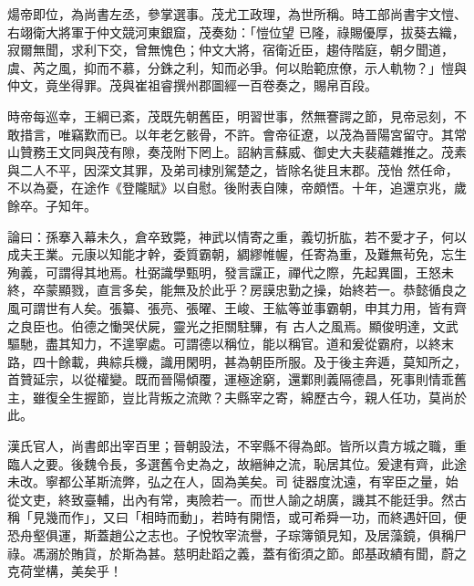 \begin{pinyinscope}
 煬帝即位，為尚書左丞，參掌選事。茂尤工政理，為世所稱。時工部尚書宇文愷、右翊衛大將軍于仲文競河東銀窟，茂奏劾：「愷位望
 已隆，祿賜優厚，拔葵去織，寂爾無聞，求利下交，曾無愧色；仲文大將，宿衛近臣，趨侍階庭，朝夕聞道，虞、芮之風，抑而不慕，分銖之利，知而必爭。何以貽範庶僚，示人軌物？」愷與仲文，竟坐得罪。茂與崔祖睿撰州郡圖經一百卷奏之，賜帛百段。



 時帝每巡幸，王綱已紊，茂既先朝舊臣，明習世事，然無謇諤之節，見帝忌刻，不敢措言，唯竊歎而已。以年老乞骸骨，不許。會帝征遼，以茂為晉陽宮留守。其常山贊務王文同與茂有隙，奏茂附下罔上。詔納言蘇威、御史大夫裴蘊雜推之。茂素與二人不平，因深文其罪，及弟司棣別駕楚之，皆除名徙且末郡。茂怡
 然任命，不以為憂，在途作《登隴賦》以自慰。後附表自陳，帝頗悟。十年，追還京兆，歲餘卒。子知年。



 論曰：孫搴入幕未久，倉卒致斃，神武以情寄之重，義切折肱，若不愛才子，何以成夫王業。元康以知能才幹，委質霸朝，綢繆帷幄，任寄為重，及難無茍免，忘生殉義，可謂得其地焉。杜弼識學甄明，發言讜正，禪代之際，先起異圖，王怒未終，卒蒙顯戮，直言多矣，能無及於此乎？房謨忠勤之操，始終若一。恭懿循良之風可謂世有人矣。張纂、張亮、張曜、王峻、王紘等並事霸朝，申其力用，皆有齊之良臣也。伯德之慟哭伏屍，靈光之拒關駐驆，有
 古人之風焉。顯俊明達，文武驅馳，盡其知力，不遑寧處。可謂德以稱位，能以稱官。道和爰從霸府，以終末路，四十餘載，典綜兵機，識用閑明，甚為朝臣所服。及于後主奔遁，莫知所之，首贊延宗，以從權變。既而晉陽傾覆，運極途窮，還鄴則義隔德昌，死事則情乖舊主，雖復全生握節，豈比背叛之流歟？夫縣宰之寄，綿歷古今，親人任功，莫尚於此。



 漢氏官人，尚書郎出宰百里；晉朝設法，不宰縣不得為郎。皆所以貴方城之職，重臨人之要。後魏令長，多選舊令史為之，故縉紳之流，恥居其位。爰逮有齊，此途未改。寧都公革斯流弊，弘之在人，固為美矣。司
 徒器度沈遠，有宰臣之量，始從文吏，終致臺輔，出內有常，夷險若一。而世人諭之胡廣，譏其不能廷爭。然古稱「見幾而作」，又曰「相時而動」，若時有開悟，或可希舜一功，而終遇奸回，便恐舟壑俱運，斯蓋趙公之志也。子悅牧宰流譽，子琮簿領見知，及居藻鏡，俱稱尸祿。馮溺於賄貨，於斯為甚。慈明赴蹈之義，蓋有銜須之節。郎基政績有聞，蔚之克荷堂構，美矣乎！



\end{pinyinscope}